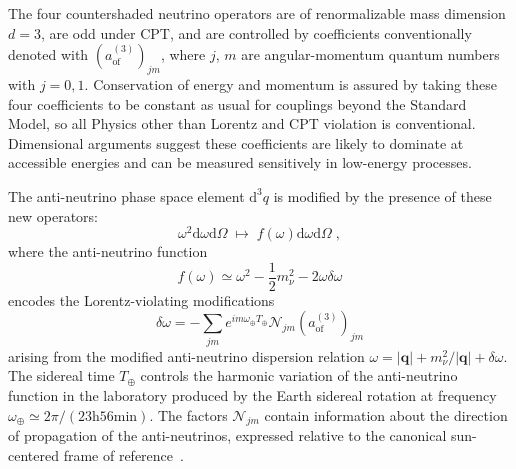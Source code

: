 The four countershaded neutrino operators are of renormalizable mass dimension
$d = 3$, are odd under CPT, and are controlled by coefficients conventionally
denoted with $(a^{(3)}_\text{of})_{jm}$, where $j$, $m$ are angular-momentum
quantum numbers with $j = 0,1$. Conservation of energy and momentum is assured
by taking these four coefficients to be constant as usual for couplings beyond
the Standard Model, so all Physics other than Lorentz and CPT violation is
conventional. Dimensional arguments suggest these coefficients are likely to
dominate at accessible energies and can be measured sensitively in low-energy
processes.

The anti-neutrino phase space element $\text{d}^3q$ is modified by the presence
of these new operators:
\begin{equation}
  \omega^2\text{d}\omega\text{d}\Omega \;\longmapsto\;
    f(\omega)\text{d}\omega\text{d}\Omega\;,
\end{equation}
where the anti-neutrino function
\begin{equation}
  f(\omega)\simeq\omega^2-\frac{1}{2}m_\nu^2-2\omega\delta\omega
\end{equation}
encodes the Lorentz-violating modifications
\begin{equation}
  \delta\omega = -\sum_{jm} e^{im\omega_\oplus T_\oplus}
    \mathcal{N}_{jm}(a_\text{of}^{(3)})_{jm}
\end{equation}
arising from the modified anti-neutrino dispersion relation \cite{SMEneutrinos}
$\omega=|\mathbf{q}|+m_\nu^2/|\mathbf{q}|+\delta\omega$. The sidereal time
$T_\oplus$ controls the harmonic variation of the anti-neutrino function in the
laboratory produced by the Earth sidereal rotation at frequency
$\omega_\oplus\simeq 2\pi/(23\text{h} 56\text{min})$. The factors
$\mathcal{N}_{jm}$ contain information about the direction of propagation of
the anti-neutrinos, expressed relative to the canonical sun-centered frame of
reference~\cite{frameor1,frameor2}.

